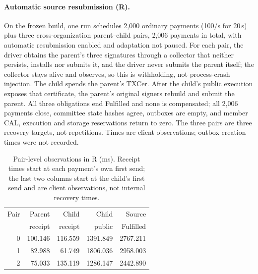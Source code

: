 \paragraph{Automatic source resubmission (R).}
On the frozen build, one run schedules 2,000 ordinary payments (100/s for 20\,s)
plus three cross-organization parent--child pairs, 2,006 payments in total, with
automatic resubmission enabled and adaptation not paused. For each pair, the driver
obtains the parent's three signatures through a collector that neither persists,
installs nor submits it, and the driver never submits the parent itself; the collector
stays alive and observes, so this is withholding, not process-crash injection. The
child spends the parent's TXCer. After the child's public execution exposes that
certificate, the parent's original signers rebuild and submit the parent. All three
obligations end Fulfilled and none is compensated; all 2,006 payments close,
committee state hashes agree, outboxes are empty, and member CAL, execution and
storage reservations return to zero. The three pairs are three recovery targets,
not repetitions. Times are client observations; outbox creation times were not
recorded.
 
\begin{table}[!t]
\caption{Pair-level observations in R (ms). Receipt times start at each payment's own
first send; the last two columns start at the child's first send and are client
observations, not internal recovery times.}
\label{tab:sup-r}
\centering\footnotesize
\begin{tabular}{@{}rrrrr@{}}
\hline
Pair & Parent & Child & Child & Source \\
 & receipt & receipt & public & Fulfilled \\
\hline
0 & 100.146 & 116.559 & 1391.849 & 2767.211 \\
1 &  82.988 &  61.749 & 1806.036 & 2958.003 \\
2 &  75.033 & 135.119 & 1286.147 & 2442.890 \\
\hline
\end{tabular}
\end{table}
 
